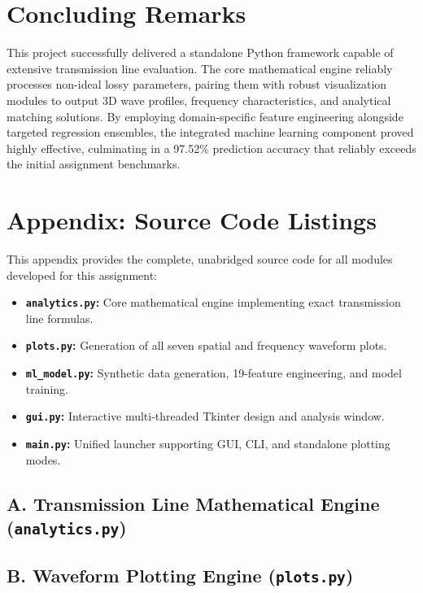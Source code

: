 \documentclass[11pt, a4paper]{article}
\begin{document}
\section{Concluding Remarks}
This project successfully delivered a standalone Python framework capable of extensive transmission line evaluation. The core mathematical engine reliably processes non-ideal lossy parameters, pairing them with robust visualization modules to output 3D wave profiles, frequency characteristics, and analytical matching solutions. By employing domain-specific feature engineering alongside targeted regression ensembles, the integrated machine learning component proved highly effective, culminating in a 97.52\% prediction accuracy that reliably exceeds the initial assignment benchmarks.

\clearpage
\section*{Appendix: Source Code Listings}
This appendix provides the complete, unabridged source code for all modules developed for this assignment:
\begin{itemize}
    \item \textbf{\texttt{analytics.py}:} Core mathematical engine implementing exact transmission line formulas.
    \item \textbf{\texttt{plots.py}:} Generation of all seven spatial and frequency waveform plots.
    \item \textbf{\texttt{ml\_model.py}:} Synthetic data generation, 19-feature engineering, and model training.
    \item \textbf{\texttt{gui.py}:} Interactive multi-threaded Tkinter design and analysis window.
    \item \textbf{\texttt{main.py}:} Unified launcher supporting GUI, CLI, and standalone plotting modes.
\end{itemize}

\subsection*{A. Transmission Line Mathematical Engine (\texttt{analytics.py})}


\clearpage
\subsection*{B. Waveform Plotting Engine (\texttt{plots.py})}

\end{document}

